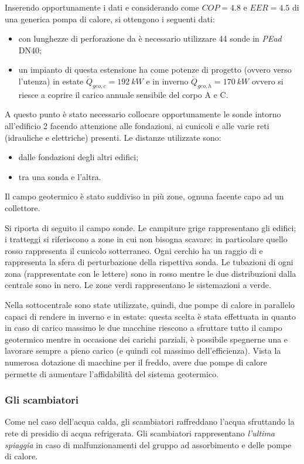 Inserendo opportunamente i dati e considerando come $COP=\num{4.8}$ e $EER=\num{4.5}$ di una generica pompa di calore, si ottengono i seguenti dati:
\begin{itemize}
	\item con lunghezze di perforazione da  è necessario utilizzare \num{44} sonde in \emph{PEad} DN40;
	\item un impianto di questa estensione ha come potenze di progetto (ovvero verso l'utenza) in estate $\dot{Q}_{geo,c}=\SI{192}{kW}$ e in inverno $\dot{Q}_{geo,h}=\SI{170}{kW}$ ovvero si riesce a coprire il carico annuale sensibile del corpo A e C.
\end{itemize}
A questo punto è stato necessario collocare opportunamente le sonde intorno all'edificio 2 facendo attenzione alle fondazioni, ai cunicoli e alle varie reti (idrauliche e elettriche) presenti. Le distanze utilizzate sono:
\begin{itemize}
	\item {} dalle fondazioni degli altri edifici;
	\item {} tra una sonda e l'altra.
\end{itemize}
Il campo geotermico è stato suddiviso in più zone, ognuna facente capo ad un collettore. 

Si riporta di seguito il campo sonde. Le campiture grige rappresentano gli edifici; i tratteggi si riferiscono a zone in cui non bisogna scavare: in particolare quello rosso rappresenta il cunicolo sotterraneo. Ogni cerchio ha un raggio di  e rappresenta la sfera di perturbazione della rispettiva sonda. Le tubazioni di ogni zona (rappresentate con le lettere) sono in rosso mentre le due distribuzioni dalla centrale sono in nero. Le zone verdi rappresentano le sistemazioni a verde.



Nella sottocentrale sono state utilizzate, quindi, due pompe di calore in parallelo capaci di rendere in inverno  e  in estate: questa scelta è stata effettuata in quanto in caso di carico massimo le due macchine riescono a sfruttare tutto il campo geotermico mentre in occasione dei carichi parziali, è possibile spegnerne una e lavorare sempre a pieno carico (e quindi col massimo dell'efficienza). Vista la numerosa dotazione di macchine per il freddo, avere due pompe di calore permette di aumentare l'affidabilità del sistema geotermico.
\subsubsection{Gli scambiatori}
Come nel caso dell'acqua calda, gli scambiatori raffreddano l'acqua sfruttando la rete di presidio di acqua refrigerata. Gli scambiatori rappresentano \emph{l'ultima spiaggia} in caso di malfunzionamenti del gruppo ad assorbimento e delle pompe di calore.


